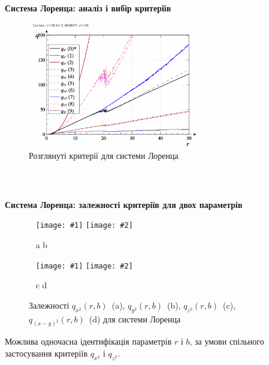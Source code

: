 \documentclass[14pt,handout,utf8]{beamer}
\newcommand{\Xhead}[1]{
 \begin{center}%
      \textbf{#1}%
 \end{center}%
}
\newcommand{\ABlbl}{%
  \vspace{-2.7ex}
  \begin{center}
    ~ \hfill a \hfill\hfill b \hfill ~
  \end{center}
  \vspace{-2.0ex}
}
\newcommand{\PicDouble}[2]{%
 \begin{center}
    ~ \hfill
    \texttt{[image: \#1]}
    \hfill
    \texttt{[image: \#2]}
    \hfill ~
  \end{center}
  \ABlbl
}
\newcommand{\PicDoubleNL}[2]{%
 \begin{center}
    ~ \hfill
    \texttt{[image: \#1]}
    \hfill
    \texttt{[image: \#2]}
    \hfill ~
  \end{center}
}
\begin{document}
\begin{frame}
  \frametitle{~}

  \Xhead{Система Лоренца: аналіз і вибір критеріїв}

  \begin{figure}
    \includegraphics[width=0.7\textwidth]{../p5/p/cha/lor/lor_q-p_q_r.png}
    \caption{Розглянуті критерії для системи Лоренца}
    \label{atu:f:lor_q}
  \end{figure}

\end{frame}




\begin{frame}
  \frametitle{~}

  \Xhead{Система Лоренца: залежності критеріїв для двох параметрів}

\begin{figure}[htb!]
  \PicDouble{../p5/p/cha/lor/q2d/lor_qx2_r_b.png}{../p5/p/cha/lor/q2d/lor_qy2_r_b.png}
  \PicDoubleNL{../p5/p/cha/lor/q2d/lor_qz2_r_b.png}{../p5/p/cha/lor/q2d/lor_qxmy2_r_b.png}
  \vspace{-2.7ex}
  \begin{center}
    ~ \hfill c \hfill\hfill d \hfill ~
  \end{center}
  \vspace{-1.5ex}
  \caption{Залежності $q_{x^2}(r,b)$~(a), $q_{y^2}(r,b)$~(b), $q_{z^2}(r,b)$~(c), $q_{(x-y)^2}(r,b)$~(d) для системи Лоренца}
  \label{atu:f:lor_q_r_b}
\end{figure}

  Можлива одночасна ідентифікація параметрів
  $r$ і
  $b$, за умови спільного застосування критеріїв
  $q_{x^2}$ і
  $q_{z^2}$.

\end{frame}
\end{document}
